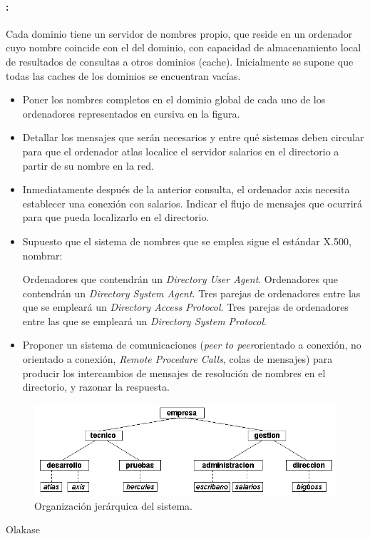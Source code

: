 \begin{problem}
  \paragraph{:} Cada dominio tiene un servidor de nombres propio, que reside en un ordenador
    cuyo nombre coincide con el del dominio, con capacidad de almacenamiento local
    de resultados de consultas a otros dominios (cache). Inicialmente se supone que
    todas las caches de los dominios se encuentran vacías.
  \begin{itemize}
    \item Poner los nombres completos en el dominio global de cada uno de los
      ordenadores representados en cursiva en la figura.
    \item Detallar los mensajes que serán necesarios y entre qué sistemas deben
        circular para que el ordenador atlas localice el servidor salarios en el
        directorio a partir de su nombre en la red.
      \item Inmediatamente después de la anterior consulta, el ordenador axis necesita
          establecer una conexión con salarios. Indicar el flujo de mensajes que ocurrirá
        para que pueda localizarlo en el directorio.
      \item Supuesto que el sistema de nombres que se emplea sigue el estándar X.500,
            nombrar:
            
              \subitem Ordenadores que contendrán un \textit{Directory User Agent}.
              \subitem Ordenadores que contendrán un \textit{Directory System Agent}.
              \subitem Tres parejas de ordenadores entre las que se empleará un \textit{Directory Access Protocol}.
              \subitem Tres parejas de ordenadores entre las que se empleará un \textit{Directory System Protocol}.
      \item Proponer un sistema de comunicaciones (\textit{peer to peer}orientado a conexión, no orientado a conexión, \textit{Remote Procedure Calls},
 colas de mensajes) para producir los intercambios de mensajes de 
resolución de nombres en el directorio, y razonar la respuesta.

\end{itemize}

\solution

  \begin{figure}[hbtp]
  \centering
  \includegraphics[width=1\textwidth]{img/si2-t4-ej-dom1.png}
  \caption{Organización jerárquica del sistema.}
  \label{Subnormalidad.}
  \end{figure}

Olakase

\end{problem}

